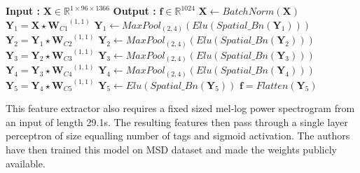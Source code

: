 \begin{algorithm}
  \caption{$\textbf{f}$ = $CHOI\_CNN(\textbf{X})$ }
  \label{alg:choicnn}      
  \begin{algorithmic}[1]
   \Statex \textbf{Input :} $\textbf{X} \in \mathbb{R}^{1 \times 96 \times 1366}$ 
   \Statex \textbf{Output :} $\textbf{f} \in \mathbb{R}^{1024}$ 
   \State $\textbf{X} \leftarrow BatchNorm(\textbf{X})$
   \State $\textbf{Y}_{1} = \textbf{X}\star {\textbf{W}_{C1}}^{(1,1)}$ 
   \State $\textbf{Y}_{1} \leftarrow MaxPool_{(2,4)}(Elu(Spatial\_Bn(\textbf{Y}_{1})))$ 
      \State $\textbf{Y}_{2} = \textbf{Y}_{1}\star {\textbf{W}_{C2}}^{(1,1)}$ 
   \State $\textbf{Y}_{2} \leftarrow MaxPool_{(2,4)}(Elu(Spatial\_Bn(\textbf{Y}_{2})))$ 
         \State $\textbf{Y}_{3} = \textbf{Y}_{2}\star {\textbf{W}_{C3}}^{(1,1)}$ 
   \State $\textbf{Y}_{3} \leftarrow MaxPool_{(2,4)}(Elu(Spatial\_Bn(\textbf{Y}_{3})))$ 
         \State $\textbf{Y}_{4} = \textbf{Y}_{3}\star {\textbf{W}_{C4}}^{(1,1)}$ 
   \State $\textbf{Y}_{4} \leftarrow MaxPool_{(2,4)}(Elu(Spatial\_Bn(\textbf{Y}_{4})))$ 
         \State $\textbf{Y}_{5} = \textbf{Y}_{4}\star {\textbf{W}_{C5}}^{(1,1)}$ 
   \State $\textbf{Y}_{5} \leftarrow Elu(Spatial\_Bn(\textbf{Y}_{5}))$ 
   \State $\textbf{f} = Flatten(\textbf{Y}_{5})$ 
  \end{algorithmic}
\end{algorithm}
\FloatBarrier

\noindent This feature extractor also requires a fixed sized mel-log power spectrogram from an input of length 29.1s. The resulting features then pass through a single layer perceptron of size equalling  number of tags and sigmoid activation. The authors have then trained this model on MSD dataset and made the weights publicly available.

